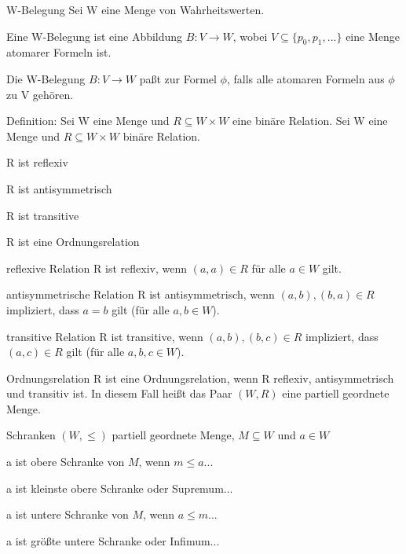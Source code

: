 \documentclass[avery5371]{flashcards}
\begin{document}
\begin{flashcard}[ Semantik ]{ W-Belegung }
    Sei W eine Menge von Wahrheitswerten.

    Eine W-Belegung ist eine Abbildung $B:V\rightarrow W$, wobei $V\subseteq\{p_0 ,p_1 ,...\}$ eine Menge atomarer Formeln ist.

    Die W-Belegung $B:V\rightarrow W$ paßt zur Formel $\phi$, falls alle atomaren Formeln aus $\phi$ zu V gehören.
\end{flashcard}

\begin{flashcard}[ Wahrheitswertebereiche ]{ Definition: Sei W eine Menge und $R\subseteq W\times W$ eine binäre Relation. }
    Sei W eine Menge und $R\subseteq W\times W$ binäre Relation.
    \begin{itemize*}
        \item R ist reflexiv
        \item R ist antisymmetrisch
        \item R ist transitive
        \item R ist eine Ordnungsrelation
    \end{itemize*}
\end{flashcard}

\begin{flashcard}[ Wahrheitswertebereiche ]{ reflexive Relation }
    R ist reflexiv, wenn $(a,a)\in R$ für alle $a\in W$ gilt.
\end{flashcard}

\begin{flashcard}[ Wahrheitswertebereiche ]{ antisymmetrische Relation }
    R ist antisymmetrisch, wenn $(a,b),(b,a)\in R$ impliziert, dass $a=b$ gilt (für alle $a,b\in W$).
\end{flashcard}

\begin{flashcard}[ Wahrheitswertebereiche ]{ transitive Relation }
    R ist transitive, wenn $(a,b),(b,c)\in R$ impliziert, dass $(a,c)\in R$ gilt (für alle $a,b,c\in W$).
\end{flashcard}

\begin{flashcard}[ Wahrheitswertebereiche ]{ Ordnungsrelation }
    R ist eine Ordnungsrelation, wenn R reflexiv, antisymmetrisch und transitiv ist. In diesem Fall heißt das Paar $(W,R)$ eine partiell geordnete Menge.
\end{flashcard}

\begin{flashcard}[ Wahrheitswertebereiche ]{ Schranken }
    $(W,\leq)$ partiell geordnete Menge, $M\subseteq W$ und $a\in W$
    \begin{itemize*}
        \item a ist obere Schranke von $M$, wenn $m\leq a$...
        \item a ist kleinste obere Schranke oder Supremum...
        \item a ist untere Schranke von $M$, wenn $a\leq m$...
        \item a ist größte untere Schranke oder Infimum...
    \end{itemize*}
\end{flashcard}
\end{document}
